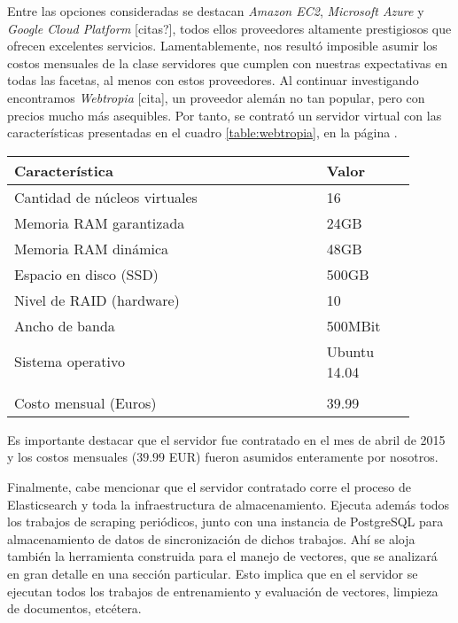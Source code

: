 Entre las opciones consideradas se destacan \textit{Amazon EC2}, \textit{Microsoft Azure} y
\textit{Google Cloud Platform} [citas?], todos ellos proveedores altamente prestigiosos que ofrecen
excelentes servicios. Lamentablemente, nos resultó imposible asumir los costos mensuales de la clase
servidores que cumplen con nuestras expectativas en todas las facetas, al menos con estos proveedores. Al
continuar investigando encontramos \textit{Webtropia} [cita], un proveedor alemán no tan popular, pero con
precios mucho más asequibles. Por tanto, se contrató un servidor virtual con las características presentadas
en el cuadro \ref{table:webtropia}, en la página \pageref{table:webtropia}.

\begin{table*}[t]
    \centering
    \begin{tabular}{p{0.70\linewidth}p{0.20\linewidth}}
        \hline
        Característica & Valor\\
        \hline
        Cantidad de núcleos virtuales & 16\\
        Memoria RAM garantizada & 24GB\\
        Memoria RAM dinámica & 48GB\\
        Espacio en disco (SSD) & 500GB\\
        Nivel de RAID (hardware) & 10\\
        Ancho de banda & 500MBit\\
        Sistema operativo & Ubuntu 14.04\\
        \\
        Costo mensual (Euros) & 39.99\\
        \hline
    \end{tabular}
    \caption{Webtropia: vServer Cloud XL 4.0 (SSD).}
    \label{table:webtropia}
\end{table*}

Es importante destacar que el servidor fue contratado en el mes de abril de 2015 y los costos mensuales
($39.99$ EUR) fueron asumidos enteramente por nosotros.

Finalmente, cabe mencionar que el servidor contratado corre el proceso de Elasticsearch y toda la
infraestructura de almacenamiento. Ejecuta además todos los trabajos de scraping periódicos, junto con
una instancia de PostgreSQL para almacenamiento de datos de sincronización de dichos trabajos. Ahí se
aloja también la herramienta construida para el manejo de vectores, que se analizará en gran detalle en una
sección particular. Esto implica que en el servidor se ejecutan todos los trabajos de entrenamiento y
evaluación de vectores, limpieza de documentos, etcétera.

